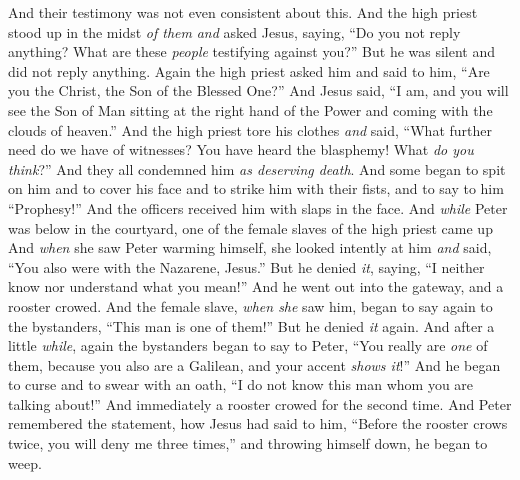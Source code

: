 \begin{biblechapter}
\verse And their testimony was not even consistent about this.
\verse And the high priest stood up in the midst \textit{of them} \textit{and} asked Jesus, saying, “Do you not reply anything? What are these \textit{people} testifying against you?”
\verse But he was silent and did not reply anything. Again the high priest asked him and said to him, “Are you the Christ, the Son of the Blessed One?”
\verse And Jesus said, “I am, and you will see the Son of Man sitting at the right hand of the Power and coming with the clouds of heaven.”
\verse And the high priest tore his clothes \textit{and} said, “What further need do we have of witnesses?
\verse You have heard the blasphemy! What \textit{do you think}?” And they all condemned him \textit{as deserving death}.
\verse And some began to spit on him and to cover his face and to strike him with their fists, and to say to him “Prophesy!” And the officers received him with slaps in the face.
 And \textit{while} Peter was below in the courtyard, one of the female slaves of the high priest came up
\verse And \textit{when} she saw Peter warming himself, she looked intently at him \textit{and} said, “You also were with the Nazarene, Jesus.”
\verse But he denied \textit{it}, saying, “I neither know nor understand what you mean!” And he went out into the gateway, and a rooster crowed.
\verse And the female slave, \textit{when she} saw him, began to say again to the bystanders, “This man is one of them!”
\verse But he denied \textit{it} again. And after a little \textit{while}, again the bystanders began to say to Peter, “You really are \textit{one} of them, because you also are a Galilean, and your accent \textit{shows it}!”
\verse And he began to curse and to swear with an oath, “I do not know this man whom you are talking about!”
\verse And immediately a rooster crowed for the second time. And Peter remembered the statement, how Jesus had said to him, “Before the rooster crows twice, you will deny me three times,” and throwing himself down, he began to weep.
\end{biblechapter}

